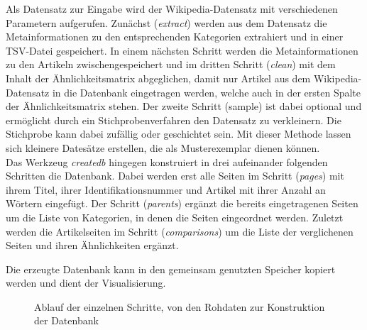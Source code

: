 Als Datensatz zur Eingabe wird der Wikipedia-Datensatz mit verschiedenen Parametern aufgerufen.
Zunächst (\emph{extract}) werden aus dem Datensatz die Metainformationen zu den entsprechenden Kategorien extrahiert und in einer TSV-Datei gespeichert.
In einem nächsten Schritt werden die Metainformationen zu den Artikeln zwischengespeichert und im dritten Schritt (\emph{clean}) mit dem Inhalt der Ähnlichkeitsmatrix abgeglichen, damit nur Artikel aus dem Wikipedia-Datensatz in die Datenbank eingetragen werden, welche auch in der ersten Spalte der Ähnlichkeitsmatrix stehen.
Der zweite Schritt (sample) ist dabei optional und ermöglicht durch ein Stichprobenverfahren den Datensatz zu verkleinern.
Die Stichprobe kann dabei zufällig oder geschichtet sein. 
Mit dieser Methode lassen sich kleinere Datesätze erstellen, die als Musterexemplar dienen können.
\\
Das Werkzeug \emph{createdb} hingegen konstruiert in drei aufeinander folgenden Schritten die Datenbank.
Dabei werden erst alle Seiten im Schritt (\emph{pages}) mit ihrem Titel, ihrer Identifikationsnummer und Artikel mit ihrer Anzahl an Wörtern eingefügt.
Der Schritt (\emph{parents}) ergänzt die bereits eingetragenen Seiten um die Liste von Kategorien, in denen die Seiten eingeordnet werden.
Zuletzt werden die Artikelseiten im Schritt (\emph{comparisons}) um die Liste der verglichenen Seiten und ihren Ähnlichkeiten ergänzt.

Die erzeugte Datenbank kann in den gemeinsam genutzten Speicher kopiert werden und dient der Visualisierung.


\begin{figure}
    \centering
    \caption{Ablauf der einzelnen Schritte, von den Rohdaten zur Konstruktion der Datenbank}
    \label{fig:ablauf-daten}
\end{figure}


